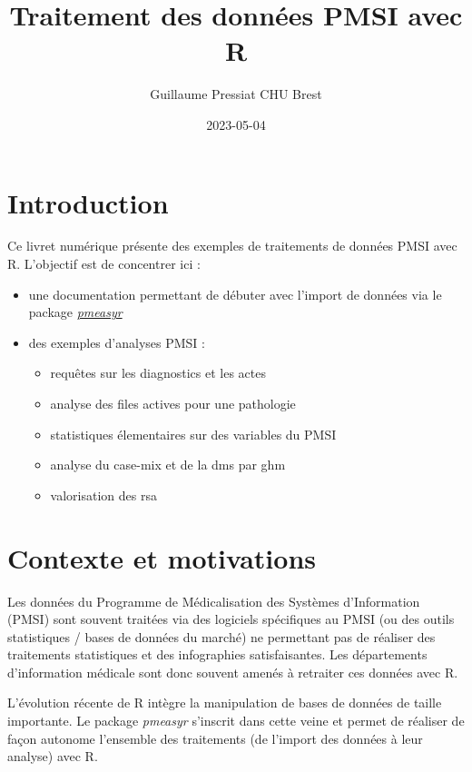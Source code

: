 \documentclass[
]{book}
\title{Traitement des données PMSI avec R}
\author{Guillaume Pressiat \textbar\textbar{} CHU Brest}
\date{2023-05-04}
\providecommand{\tightlist}{%
  \setlength{\itemsep}{0pt}\setlength{\parskip}{0pt}}
\begin{document}
\maketitle

{
\setcounter{tocdepth}{1}
\tableofcontents
}
\hypertarget{introduction}{%
\chapter{Introduction}\label{introduction}}

Ce livret numérique présente des exemples de traitements de données PMSI avec R. L'objectif est de concentrer ici :

\begin{itemize}
\item
  une documentation permettant de débuter avec l'import de données via le package \href{https://github.com/GuillaumePressiat/pmeasyr}{\emph{pmeasyr}}
\item
  des exemples d'analyses PMSI :

  \begin{itemize}
  \tightlist
  \item
    requêtes sur les diagnostics et les actes
  \item
    analyse des files actives pour une pathologie
  \item
    statistiques élementaires sur des variables du PMSI
  \item
    analyse du case-mix et de la dms par ghm
  \item
    valorisation des rsa
  \end{itemize}
\end{itemize}

\hypertarget{contexte}{%
\chapter{Contexte et motivations}\label{contexte}}

Les données du Programme de Médicalisation des Systèmes d'Information (PMSI) sont souvent traitées via des logiciels spécifiques au PMSI (ou des outils statistiques / bases de données du marché) ne permettant pas de réaliser des traitements statistiques et des infographies satisfaisantes. Les départements d'information médicale sont donc souvent amenés à retraiter ces données avec R.

L'évolution récente de R intègre la manipulation de bases de données de taille importante. Le package \emph{pmeasyr} s'inscrit dans cette veine et permet de réaliser de façon autonome l'ensemble des traitements (de l'import des données à leur analyse) avec R.
\end{document}
